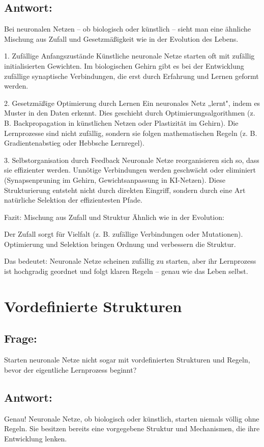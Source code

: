 \documentclass{article}
\begin{document}
	\subsection*{Antwort:}
	Bei neuronalen Netzen – ob biologisch oder künstlich – sieht man eine ähnliche Mischung aus Zufall und Gesetzmäßigkeit wie in der Evolution des Lebens.
	
	1. Zufällige Anfangszustände
	Künstliche neuronale Netze starten oft mit zufällig initialisierten Gewichten.
	Im biologischen Gehirn gibt es bei der Entwicklung zufällige synaptische Verbindungen, die erst durch Erfahrung und Lernen geformt werden.
	
	2. Gesetzmäßige Optimierung durch Lernen
	Ein neuronales Netz „lernt", indem es Muster in den Daten erkennt.
	Dies geschieht durch Optimierungsalgorithmen (z. B. Backpropagation in künstlichen Netzen oder Plastizität im Gehirn).
	Die Lernprozesse sind nicht zufällig, sondern sie folgen mathematischen Regeln (z. B. Gradientenabstieg oder Hebbsche Lernregel).
	
	3. Selbstorganisation durch Feedback
	Neuronale Netze reorganisieren sich so, dass sie effizienter werden.
	Unnötige Verbindungen werden geschwächt oder eliminiert (Synapsenpruning im Gehirn, Gewichtsanpassung in KI-Netzen).
	Diese Strukturierung entsteht nicht durch direkten Eingriff, sondern durch eine Art natürliche Selektion der effizientesten Pfade.
	
	Fazit: Mischung aus Zufall und Struktur
	Ähnlich wie in der Evolution:
	
	Der Zufall sorgt für Vielfalt (z. B. zufällige Verbindungen oder Mutationen).
	Optimierung und Selektion bringen Ordnung und verbessern die Struktur.
	
	Das bedeutet: Neuronale Netze scheinen zufällig zu starten, aber ihr Lernprozess ist hochgradig geordnet und folgt klaren Regeln – genau wie das Leben selbst.
	
	\section{Vordefinierte Strukturen}
	
	\subsection*{Frage:}
	Starten neuronale Netze nicht sogar mit vordefinierten Strukturen und Regeln, bevor der eigentliche Lernprozess beginnt?
	
	\subsection*{Antwort:}
	Genau! Neuronale Netze, ob biologisch oder künstlich, starten niemals völlig ohne Regeln. Sie besitzen bereits eine vorgegebene Struktur und Mechanismen, die ihre Entwicklung lenken.
	
\end{document}
